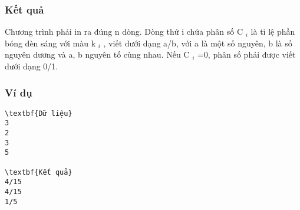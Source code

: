 \subsubsection{   Kết quả  }

   Chương trình phải in ra đúng n dòng. Dòng thứ i chứa phân số C   $_    i   $   là tỉ lệ phần bóng đèn sáng với màu k   $_    i   $   , viết dưới dạng a/b, với a là một số nguyên, b là số nguyên dương và a, b nguyên tố cùng nhau. Nếu C   $_    i   $   =0, phân số phải được viết dưới dạng 0/1.  

\subsubsection{   Ví dụ  }
\begin{verbatim}
\textbf{Dữ liệu}
3
2
3
5

\textbf{Kết quả}
4/15
4/15
1/5
\end{verbatim}